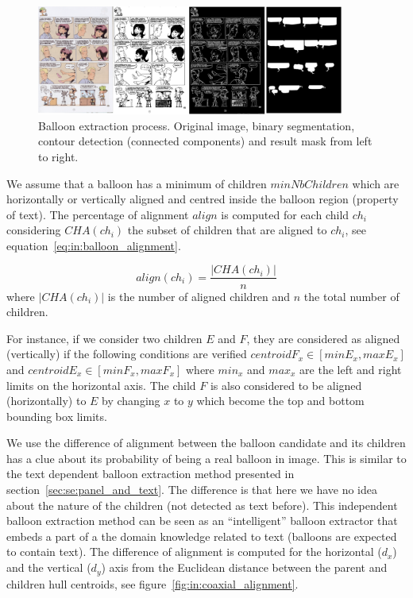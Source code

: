  \begin{figure}[!ht]  %
   \centering
  \includegraphics[width=0.9\textwidth]{closed_balloon_process.png}
  \caption[Balloon extraction process]{Balloon extraction process. Original image, binary segmentation, contour detection (connected components) and result mask from left to right.}
  \label{fig:in:balloon_binarisation}
 \end{figure}

We assume that a balloon has a minimum of children $minNbChildren$ which are horizontally or vertically aligned and centred inside the balloon region (property of text).
The percentage of alignment $align$ is computed for each child $ch_i$ considering $CHA(ch_i)$ the subset of children that are aligned to $ch_i$, see equation~\ref{eq:in:balloon_alignment}.

\begin{equation}
	\label{eq:in:balloon_alignment}
	align(ch_i) = \frac{|CHA(ch_i)|}{n}
\end{equation}
where $|CHA(ch_i)|$ is the number of aligned children and $n$ the total number of children.


For instance, if we consider two children $E$ and $F$, they are considered as aligned (vertically) if the following conditions are verified $centroidF_x \in [minE_x, maxE_x]$ and $centroidE_x \in [minF_x, maxF_x]$ where $min_x$ and $max_x$ are the left and right limits on the horizontal axis.
The child $F$ is also considered to be aligned (horizontally) to $E$ by changing $x$ to $y$ which become the top and bottom bounding box limits.

We use the difference of alignment between the balloon candidate and its children has a clue about its probability of being a real balloon in image.
This is similar to the text dependent balloon extraction method presented in section~\ref{sec:se:panel_and_text}.
The difference is that here we have no idea about the nature of the children (not detected as text before).
This independent balloon extraction method can be seen as an ``intelligent'' balloon extractor that embeds a part of a the domain knowledge related to text (balloons are expected to contain text).
The difference of alignment is computed for the horizontal ($d_x$) and the vertical ($d_y$) axis from the Euclidean distance between the parent and children hull centroids, see figure~\ref{fig:in:coaxial_alignment}.


